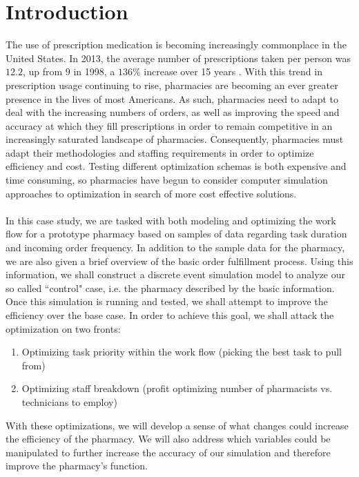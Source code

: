 \documentclass[10pt]{report}            %
\begin{document}
\section*{Introduction}                %
The use of prescription medication is becoming increasingly commonplace in the United States. In 2013, the average number of prescriptions taken per person was $12.2$, up from $9$ in 1998, a $136\%$ increase over 15 years \cite{georgetown}\cite{statistica}. With this trend in prescription usage continuing to rise, pharmacies are becoming an ever greater presence in the lives of most Americans. As such, pharmacies need to adapt to deal with the increasing numbers of orders, as well as improving the speed and accuracy at which they fill prescriptions in order to remain competitive in an increasingly saturated landscape of pharmacies.  Consequently, pharmacies must adapt their methodologies and staffing requirements in order to optimize efficiency and cost. Testing different optimization schemas is both expensive and time consuming, so pharmacies have begun to consider computer simulation approaches to optimization in search of more cost effective solutions.\\\hfill\\
In this case study, we are tasked with both modeling and optimizing the work flow for a prototype pharmacy based on samples of data regarding task duration and incoming order frequency. In addition to the sample data for the pharmacy, we are also given a brief overview of the basic order fulfillment process. Using this information, we shall construct a discrete event simulation model to analyze our so called ``control" case, i.e. the pharmacy described by the basic information. Once this simulation is running and tested, we shall attempt to improve the efficiency over the base case. In order to achieve this goal, we shall attack the optimization on two fronts:
\begin{enumerate}
\item Optimizing task priority within the work flow (picking the best task to pull from)
\item Optimizing staff breakdown (profit optimizing number of pharmacists vs. technicians to employ)
\end{enumerate}
With these optimizations, we will develop a sense of what changes could increase the efficiency of the pharmacy. We will also address which variables could be manipulated to further increase the accuracy of our simulation and therefore improve the pharmacy's function.
\end{document}

